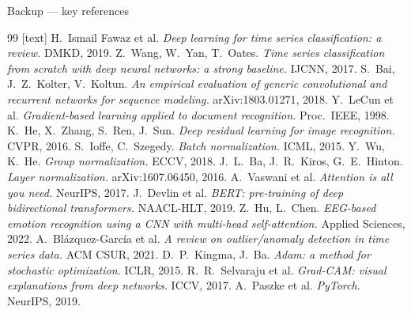 \documentclass[11pt, aspectratio=169]{beamer}
\begin{document}
\begin{frame}[allowframebreaks]{Backup --- key references}
  \footnotesize
  \begin{thebibliography}{99}
    [text]
     H.\ Ismail Fawaz et al. \emph{Deep learning for time series
      classification: a review.} DMKD, 2019.
     Z.\ Wang, W.\ Yan, T.\ Oates. \emph{Time series classification
      from scratch with deep neural networks: a strong baseline.} IJCNN, 2017.
     S.\ Bai, J.\ Z.\ Kolter, V.\ Koltun. \emph{An empirical
      evaluation of generic convolutional and recurrent networks for sequence
      modeling.} arXiv:1803.01271, 2018.
     Y.\ LeCun et al. \emph{Gradient-based learning applied to
      document recognition.} Proc.\ IEEE, 1998.
     K.\ He, X.\ Zhang, S.\ Ren, J.\ Sun. \emph{Deep residual
      learning for image recognition.} CVPR, 2016.
     S.\ Ioffe, C.\ Szegedy. \emph{Batch normalization.} ICML, 2015.
     Y.\ Wu, K.\ He. \emph{Group normalization.} ECCV, 2018.
     J.\ L.\ Ba, J.\ R.\ Kiros, G.\ E.\ Hinton. \emph{Layer
      normalization.} arXiv:1607.06450, 2016.
     A.\ Vaswani et al. \emph{Attention is all you need.}
      NeurIPS, 2017.
     J.\ Devlin et al. \emph{BERT: pre-training of deep
      bidirectional transformers.} NAACL-HLT, 2019.
     Z.\ Hu, L.\ Chen. \emph{EEG-based emotion recognition using a
      CNN with multi-head self-attention.} Applied Sciences, 2022.
     A.\ Bl\'azquez-Garc\'ia et al. \emph{A review on
      outlier/anomaly detection in time series data.} ACM CSUR, 2021.
     D.\ P.\ Kingma, J.\ Ba. \emph{Adam: a method for stochastic
      optimization.} ICLR, 2015.
     R.\ R.\ Selvaraju et al. \emph{Grad-CAM: visual
      explanations from deep networks.} ICCV, 2017.
     A.\ Paszke et al. \emph{PyTorch.} NeurIPS, 2019.
  \end{thebibliography}
\end{frame}
\end{document}
